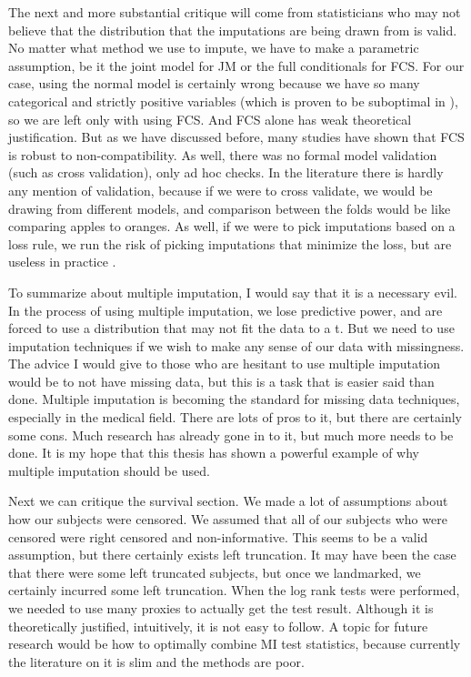 The next and more substantial critique will come from statisticians who may not believe that the distribution that the imputations are being drawn from is valid. No matter what method we use to impute, we have to make a parametric assumption, be it the joint model for JM or the full conditionals for FCS.  For our case, using the normal model is certainly wrong because we have so many categorical and strictly positive variables (which is proven to be suboptimal in \cite{Kropko2014}), so we are left only with using FCS. And FCS alone has weak theoretical justification. But as we have discussed before, many studies have shown that FCS is robust to non-compatibility. As well, there was no formal model validation (such as cross validation), only ad hoc checks. In the literature there is hardly any mention of validation, because if we were to cross validate, we would be drawing from different models, and comparison between the folds would be like comparing apples to oranges. As well, if we were to pick imputations based on a loss rule, we run the risk of picking imputations that minimize the loss, but are useless in practice \cite{VanBuuren2012}.

\begin{comment}
An interesting future extension to this project would be to use a non parametric approach to multiple imputation, such as the one suggested by Long et al in \cite{Long2012}. But at the time of publication, there is not much literature or software on this subject, so I felt that it was not appropriate to use its results.  
\end{comment}
To summarize about multiple imputation, I would say that it is a necessary evil. In the process of using multiple imputation, we lose predictive power, and are forced to use a distribution that may not fit the data to a t. But we need to use imputation techniques if we wish to make any sense of our data with missingness. The advice I would give to those who are hesitant to use multiple imputation would be to not have missing data, but this is a task that is easier said than done. Multiple imputation is becoming the standard for missing data techniques, especially in the medical field. There are lots of pros to it, but there are certainly some cons. Much research has already gone in to it, but much more needs to be done. It is my hope that this thesis has shown a powerful example of why multiple imputation should be used.

Next we can critique the survival section. We made a lot of assumptions about how our subjects were censored. We assumed that all of our subjects who were censored were right censored and non-informative. This seems to be a valid assumption, but there certainly exists left truncation. It may have been the case that there were some left truncated subjects, but once we landmarked, we certainly incurred some left truncation. When the log rank tests were performed, we needed to use many proxies to actually get the test result. Although it is theoretically justified, intuitively, it is not easy to follow. A topic for future research would be how to optimally combine MI test statistics, because currently the literature on it is slim and the methods are poor.

